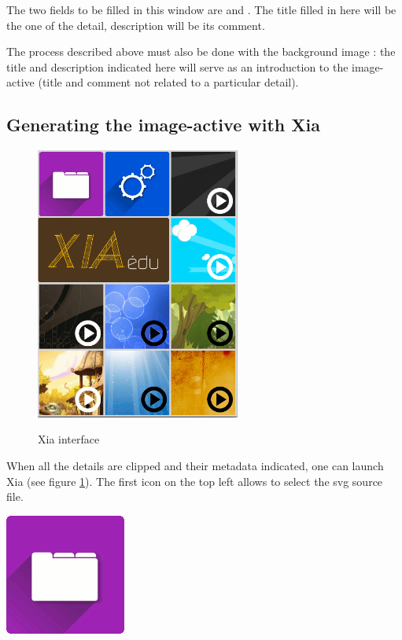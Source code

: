 The two fields to be filled in this window are  and 
.  The title filled in here will be the one of the detail, 
description will be its comment.

The process described above must also be done with the background image : 
the title and description indicated here will serve as an introduction to 
the image-active (title and comment not related to a particular detail).

\subsection{Generating the image-active with Xia}

\begin{figure}[htp]
 \centering
 \caption{Xia interface}
 \includegraphics[width=0.6\textwidth]{./images/xia_vue_generale}
 \label{xia_interface}
\end{figure}

When all the details are clipped and their metadata indicated, one can launch 
Xia (see figure  
\ref{xia_interface}). The first icon on the top left allows 
to select the svg source file.

\begin{center}
\includegraphics[scale=0.4]{./images/xia_open} 
\end{center}

